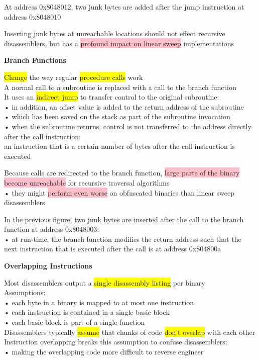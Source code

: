 \documentclass[]{project_plan}
\begin{document}
At address 0x8048012, two junk bytes are added after the jump instruction at address 0x8048010

Inserting junk bytes at unreachable locations should not effect recursive disassemblers, but has a
\colorbox{pink}{profound impact on linear sweep} implementations

\textbf{Branch Functions}

\colorbox{yellow}{Change} the way regular \colorbox{yellow}{procedure calls} work\\
A normal call to a subroutine is replaced with a call to the branch function\\
It uses an \colorbox{yellow}{indirect jump} to transfer control to the original subroutine:\\
• in addition, an offset value is added to the return address of the subroutine\\
• which has been saved on the stack as part of the subroutine invocation\\
• when the subroutine returns, control is not transferred to the address directly after the call instruction:\\
an instruction that is a certain number of bytes after the call instruction is executed

Because calls are redirected to the branch function, \colorbox{pink}{large parts of the binary become unreachable}
for recursive traversal algorithms\\
• they might \colorbox{pink}{perform even worse} on obfuscated binaries than linear sweep disassemblers

In the previous figure, two junk bytes are inserted after the call to the branch function at address
0x8048003:\\
• at run-time, the branch function modifies the return address such that the next instruction that is executed
after the call is at address 0x804800a

\textbf{Overlapping Instructions}

Most disassemblers output a \colorbox{yellow}{single disassembly listing} per binary\\
Assumptions:\\
• each byte in a binary is mapped to at most one instruction\\
• each instruction is contained in a single basic block\\
• each basic block is part of a single function\\
Disassemblers typically \colorbox{yellow}{assume} that chunks of code \colorbox{yellow}{don’t overlap} with each other\\
Instruction overlapping breaks this assumption to confuse disassemblers:\\
• making the overlapping code more difficult to reverse engineer
\end{document}
